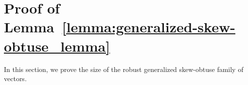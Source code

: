 \section{Proof of Lemma~\ref{lemma:generalized-skew-obtuse_lemma}}\label{apx:proof_general_skew_obtuse}

In this section, we prove the size of the robust generalized skew-obtuse family of vectors. 


